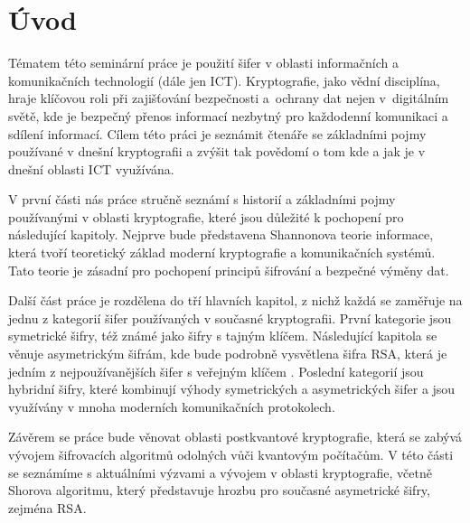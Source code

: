 \section {Úvod}
Tématem této seminární práce je použití šifer v oblasti informačních a komunikačních technologií (dále jen ICT). Kryptografie, jako vědní disciplína, hraje klíčovou roli při zajišťování bezpečnosti a ochrany dat nejen v digitálním světě, kde je bezpečný přenos informací nezbytný pro každodenní komunikaci a sdílení informací. Cílem této práci je seznámit čtenáře se základními pojmy používané v dnešní kryptografii a zvýšit tak povědomí o tom kde a jak je v dnešní oblasti ICT využívána.

V první části nás práce stručně seznámí s historií a základními pojmy používanými v oblasti kryptografie, které jsou důležité k pochopení pro následující kapitoly. Nejprve bude představena Shannonova teorie informace, která tvoří teoretický základ moderní kryptografie a komunikačních systémů. Tato teorie je zásadní pro pochopení principů šifrování a bezpečné výměny dat.

Další část práce je rozdělena do tří hlavních kapitol, z nichž každá se zaměřuje na jednu z kategorií šifer používaných v současné kryptografii. První kategorie jsou symetrické šifry, též známé jako šifry s tajným klíčem. Následující kapitola se věnuje asymetrickým šifrám, kde bude podrobně vysvětlena šifra RSA, která je jedním z nejpoužívanějších šifer s veřejným klíčem \parencite{drake2024}. Poslední kategorií jsou hybridní šifry, které kombinují výhody symetrických a asymetrických šifer a jsou využívány v mnoha moderních komunikačních protokolech.

Závěrem se práce bude věnovat oblasti postkvantové kryptografie, která se zabývá vývojem šifrovacích algoritmů odolných vůči kvantovým počítačům. V této části se seznámíme s aktuálními výzvami a vývojem v oblasti kryptografie, včetně Shorova algoritmu, který představuje hrozbu pro současné asymetrické šifry, zejména RSA.
\newpage